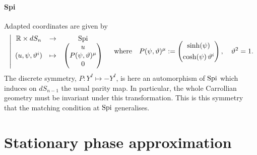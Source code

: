 \documentclass[a4paper, 10pt]{article}
\theoremstyle{remark}
\newcommand{\Spi}{\textnormal{Spi}}
\begin{document}
\paragraph{Spi}

Adapted coordinates are given by
\begin{align}
    &\left|\begin{array}{ccc}
     \mathbb{R} \times dS_{n}  & \to &  \Spi  \\
      (u , \psi, \vartheta^i )    & \mapsto & \begin{pmatrix}
           u \\ P(\psi, \vartheta)^{\mu} \\ 0
      \end{pmatrix} 
    \end{array}\right. & \text{where}\quad P(\psi, \vartheta)^{\mu} :=  \begin{pmatrix}
        \sinh(\psi) \\[0.4em] \cosh(\psi) \,\vartheta^i
    \end{pmatrix},\quad \vartheta^2=1.
\end{align}
The discrete symmetry, $P: Y^I \mapsto -Y^I$, is here an automorphism of $\Spi$ which induces on $dS_{n-1}$ the usual parity map. In particular, the whole Carrollian geometry must be invariant under this transformation. This is this symmetry that the matching condition at $\Spi$ generalises.

\section{Stationary phase approximation} \label{Section::AppendixSPA}
\end{document}
